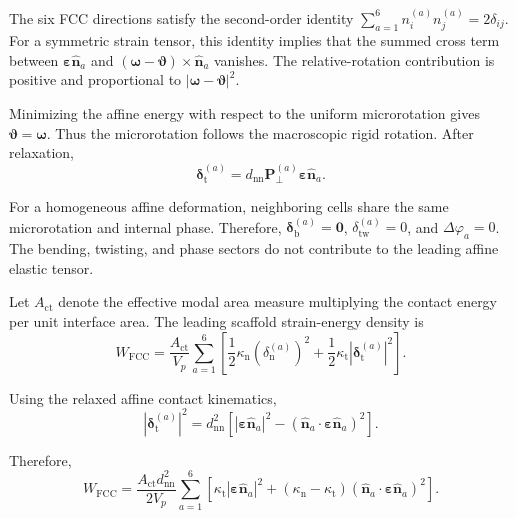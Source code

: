 The six FCC directions satisfy the second-order identity $\sum_{a=1}^{6} n_i^{(a)}n_j^{(a)} = 2\delta_{ij}$. For a symmetric strain tensor, this identity implies that the summed cross term between $\boldsymbol{\varepsilon}\hat{\mathbf{n}}_a$ and $(\boldsymbol{\omega}-\boldsymbol{\vartheta})\times\hat{\mathbf{n}}_a$ vanishes. The relative-rotation contribution is positive and proportional to $|\boldsymbol{\omega}-\boldsymbol{\vartheta}|^2$.

Minimizing the affine energy with respect to the uniform microrotation gives $\boldsymbol{\vartheta}=\boldsymbol{\omega}$. Thus the microrotation follows the macroscopic rigid rotation. After relaxation,
\begin{equation}
    \boldsymbol{\delta}_{\mathrm{t}}^{(a)} = d_{\mathrm{nn}} \mathbf{P}_\perp^{(a)} \boldsymbol{\varepsilon}\hat{\mathbf{n}}_a.
\end{equation}

For a homogeneous affine deformation, neighboring cells share the same microrotation and internal phase. Therefore, $\boldsymbol{\delta}_{\mathrm{b}}^{(a)}=\mathbf{0}$, $\delta_{\mathrm{tw}}^{(a)}=0$, and $\Delta\varphi_a=0$. The bending, twisting, and phase sectors do not contribute to the leading affine elastic tensor.

Let $A_{\mathrm{ct}}$ denote the effective modal area measure multiplying the contact energy per unit interface area. The leading scaffold strain-energy density is
\begin{equation}
    W_{\mathrm{FCC}} = \frac{A_{\mathrm{ct}}}{V_p} \sum_{a=1}^{6} \left[ \frac{1}{2}\kappa_{\mathrm{n}} (\delta_{\mathrm{n}}^{(a)})^2 + \frac{1}{2}\kappa_{\mathrm{t}} |\boldsymbol{\delta}_{\mathrm{t}}^{(a)}|^2 \right].
\end{equation}

Using the relaxed affine contact kinematics,
\begin{equation}
    |\boldsymbol{\delta}_{\mathrm{t}}^{(a)}|^2 = d_{\mathrm{nn}}^2 \left[ |\boldsymbol{\varepsilon}\hat{\mathbf{n}}_a|^2 - (\hat{\mathbf{n}}_a\cdot \boldsymbol{\varepsilon} \hat{\mathbf{n}}_a)^2 \right].
\end{equation}

Therefore,
\begin{equation}
    W_{\mathrm{FCC}} = \frac{A_{\mathrm{ct}}d_{\mathrm{nn}}^2}{2V_p} \sum_{a=1}^{6} \left[ \kappa_{\mathrm{t}} |\boldsymbol{\varepsilon}\hat{\mathbf{n}}_a|^2 + (\kappa_{\mathrm{n}}-\kappa_{\mathrm{t}}) (\hat{\mathbf{n}}_a\cdot \boldsymbol{\varepsilon} \hat{\mathbf{n}}_a)^2 \right].
\end{equation}

